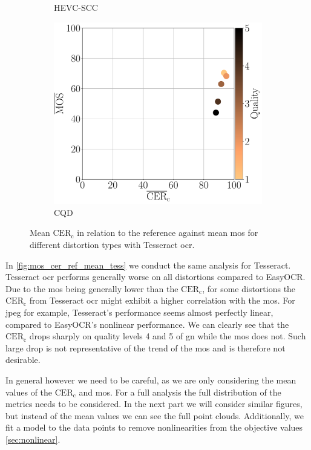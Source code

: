 \begin{figure}[h!]
\begin{subfigure}[b]{0.3\textwidth}
        \caption{HEVC-SCC}
        \label{fig:mos_cer_ref_mean_tess_HEVC-SCC}
    \end{subfigure}
    \hfill
    \begin{subfigure}[b]{0.3\textwidth}
        \includegraphics[width=\textwidth]{../../images/analyze/mos_cer_ref_mean_tess_CQD.pdf}
        \caption{CQD}
        \label{fig:mos_cer_ref_mean_tess_CQD}
    \end{subfigure}
    \caption{Mean $\text{CER}_{\text{c}}$ in relation to the reference against mean \gls{mos} for different distortion types with Tesseract \gls{ocr}.}
\label{fig:mos_cer_ref_mean_tess}
\end{figure}

In \autoref{fig:mos_cer_ref_mean_tess} we conduct the same analysis for Tesseract.
Tesseract \gls{ocr} performs generally worse on all distortions compared to EasyOCR.
Due to the \gls{mos} being generally lower than the $\text{CER}_{\text{c}}$, for some distortions the $\text{CER}_{\text{c}}$ from Tesseract \gls{ocr} might exhibit a higher correlation with the \gls{mos}.
For \gls{jpeg} for example, Tesseract's performance seems almost perfectly linear, compared to EasyOCR's nonlinear performance.
We can clearly see that the $\text{CER}_{\text{c}}$ drops sharply on quality levels 4 and 5 of \gls{gn} while the \gls{mos} does not.
Such large drop is not representative of the trend of the \gls{mos} and is therefore not desirable.


In general however we need to be careful, as we are only considering the mean values of the $\text{CER}_{\text{c}}$ and \gls{mos}.
For a full analysis the full distribution of the metrics needs to be considered.
In the next part we will consider similar figures, but instead of the mean values we can see the full point clouds.
Additionally, we fit a model to the data points to remove nonlinearities from the objective values \autoref{sec:nonlinear}.





